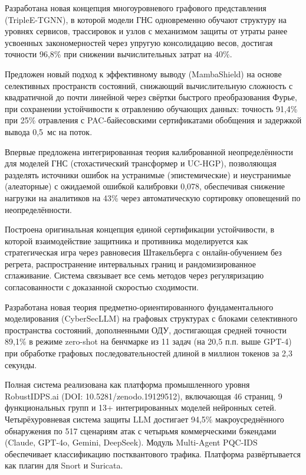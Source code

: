 Разработана новая концепция многоуровневого графового представления (TripleE-TGNN), в которой модели ГНС одновременно обучают структуру на уровнях сервисов, трассировок и узлов с механизмом защиты от утраты ранее усвоенных закономерностей через упругую консолидацию весов, достигая точности 96,8\% при снижении вычислительных затрат на 40\%.

Предложен новый подход к эффективному выводу (MambaShield) на основе селективных пространств состояний, снижающий вычислительную сложность с квадратичной до почти линейной через свёртки быстрого преобразования Фурье, при сохранении устойчивости к отравлению обучающих данных: точность 91,4\% при 25\% отравления с PAC-байесовскими сертификатами обобщения и задержкой вывода 0,5~мс на поток.

Впервые предложена интегрированная теория калиброванной неопределённости для моделей ГНС (стохастический трансформер и UC-HGP), позволяющая разделять источники ошибок на устранимые (эпистемические) и неустранимые (алеаторные) с ожидаемой ошибкой калибровки 0,078, обеспечивая снижение нагрузки на аналитиков на 43\% через автоматическую сортировку оповещений по неопределённости.

Построена оригинальная концепция единой сертификации устойчивости, в которой взаимодействие защитника и противника моделируется как стратегическая игра через равновесия Штакельберга с онлайн-обучением без регрета, распространение интервальных границ и рандомизированное сглаживание. Система связывает все семь методов через регуляризацию согласованности с доказанной скоростью сходимости.

Разработана новая теория предметно-ориентированного фундаментального моделирования (CyberSecLLM) на графовых структурах с блоками селективного пространства состояний, дополненными ОДУ, достигающая средней точности 89,1\% в режиме zero-shot на бенчмарке из 11 задач (на 20,5 п.п. выше GPT-4) при обработке графовых последовательностей длиной в миллион токенов за 2,3 секунды.

Полная система реализована как платформа промышленного уровня RobustIDPS.ai (DOI: 10.5281/zenodo.19129512), включающая 46 страниц, 9 функциональных групп и 13+ интегрированных моделей нейронных сетей. Четырёхуровневая система защиты LLM достигает 94,5\% макроусреднённого обнаружения по 517 сценариям атак с четырьмя коммерческими бэкендами (Claude, GPT-4o, Gemini, DeepSeek). Модуль Multi-Agent PQC-IDS обеспечивает классификацию постквантового трафика. Платформа развёртывается как плагин для Snort и Suricata.

